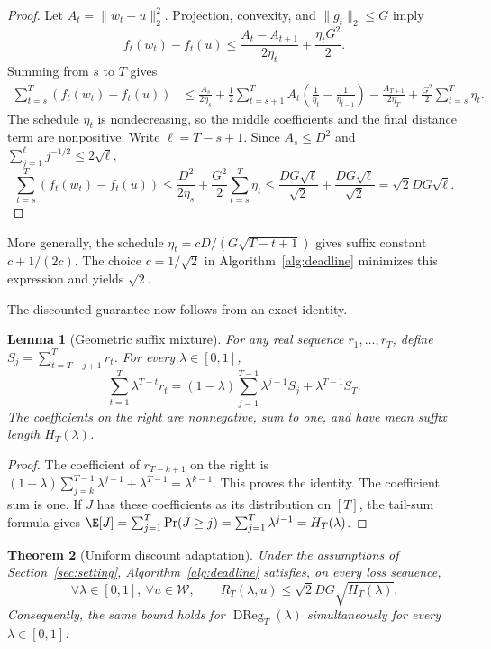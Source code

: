 \documentclass{article}
\newtheorem{theorem}{Theorem}
\newtheorem{lemma}[theorem]{Lemma}
\newcommand{\W}{\mathcal W}
\newcommand{\DReg}{\operatorname{DReg}}
\begin{document}
\begin{proof}
Let $A_t=\|w_t-u\|_2^2$. Projection, convexity, and $\|g_t\|_2\le G$ imply
\begin{equation}
f_t(w_t)-f_t(u)\le \frac{A_t-A_{t+1}}{2\eta_t}+\frac{\eta_tG^2}{2}.
\label{eq:onestep}
\end{equation}
Summing from $s$ to $T$ gives
\begin{align}
\sum_{t=s}^T(f_t(w_t)-f_t(u))
&\le \frac{A_s}{2\eta_s}+\frac12\sum_{t=s+1}^TA_t\left(\frac1{\eta_t}-\frac1{\eta_{t-1}}\right)-\frac{A_{T+1}}{2\eta_T}+\frac{G^2}{2}\sum_{t=s}^T\eta_t.\label{eq:telescope}
\end{align}
The schedule $\eta_t$ is nondecreasing, so the middle coefficients and the final distance term are nonpositive. Write $\ell=T-s+1$. Since $A_s\le D^2$ and $\sum_{j=1}^{\ell}j^{-1/2}\le2\sqrt\ell$, \[ \sum_{t=s}^T(f_t(w_t)-f_t(u))\le\frac{D^2}{2\eta_s}+\frac{G^2}{2}\sum_{t=s}^T\eta_t\le\frac{DG\sqrt\ell}{\sqrt2}+\frac{DG\sqrt\ell}{\sqrt2}=\sqrt2DG\sqrt\ell. \]
\end{proof}

More generally, the schedule $\eta_t=cD/(G\sqrt{T-t+1})$ gives suffix constant $c+1/(2c)$. The choice $c=1/\sqrt2$ in Algorithm~\ref{alg:deadline} minimizes this expression and yields $\sqrt2$.

The discounted guarantee now follows from an exact identity.

\begin{lemma}[Geometric suffix mixture]
\label{lem:abel}
For any real sequence $r_1,\ldots,r_T$, define $S_j=\sum_{t=T-j+1}^Tr_t$. For every $\lambda\in[0,1]$,
\begin{equation}
\sum_{t=1}^T\lambda^{T-t}r_t=(1-\lambda)\sum_{j=1}^{T-1}\lambda^{j-1}S_j+\lambda^{T-1}S_T.
\label{eq:abel}
\end{equation}
The coefficients on the right are nonnegative, sum to one, and have mean suffix length $H_T(\lambda)$.
\end{lemma}

\begin{proof}
The coefficient of $r_{T-k+1}$ on the right is $(1-\lambda)\sum_{j=k}^{T-1}\lambda^{j-1}+\lambda^{T-1}=\lambda^{k-1}$. This proves the identity. The coefficient sum is one. If $J$ has these coefficients as its distribution on $[T]$, the tail-sum formula gives $\E[J]=\sum_{j=1}^T\Pr(J\ge j)=\sum_{j=1}^T\lambda^{j-1}=H_T(\lambda)$.
\end{proof}

\begin{theorem}[Uniform discount adaptation]
\label{thm:upper}
Under the assumptions of Section~\ref{sec:setting}, Algorithm~\ref{alg:deadline} satisfies, on every loss sequence,
\begin{equation}
\forall\lambda\in[0,1],\ \forall u\in\W,\qquad
R_T(\lambda,u)\le\sqrt2DG\sqrt{H_T(\lambda)}.
\label{eq:upper}
\end{equation}
Consequently, the same bound holds for $\DReg_T(\lambda)$ simultaneously for every $\lambda\in[0,1]$.
\end{theorem}
\end{document}
